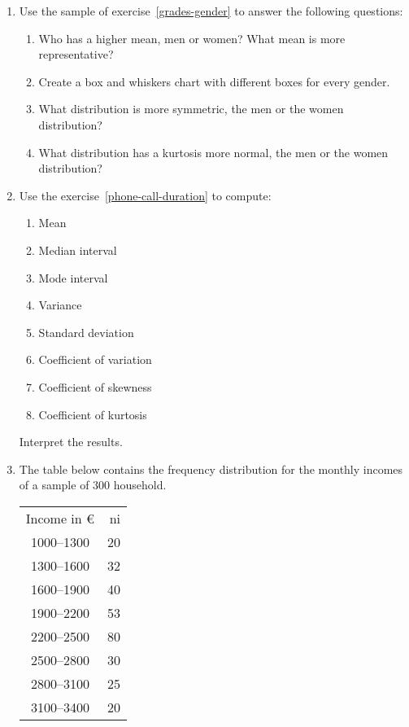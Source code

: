 \begin{enumerate}[leftmargin=*,resume]
\item Use the sample of exercise~\ref{grades-gender} to answer the following questions:
\begin{enumerate}
\item Who has a higher mean, men or women?
What mean is more representative?
\item Create a box and whiskers chart with different boxes for every gender. 
\item What distribution is more symmetric, the men or the women distribution?
\item What distribution has a kurtosis more normal, the men or the women distribution?
\end{enumerate}

\item Use the exercise~\ref{phone-call-duration} to compute:
\begin{enumerate}
\item Mean
\item Median interval
\item Mode interval
\item Variance
\item Standard deviation
\item Coefficient of variation
\item Coefficient of skewness
\item Coefficient of kurtosis
\end{enumerate}
Interpret the results. 

\item The table below contains the frequency distribution for the monthly incomes of a sample of 300 household.
\begin{center}
\begin{tabular}{cr}
\toprule
Income in € & 	ni\\
1000--1300	&	20\\
1300--1600	&	32\\
1600--1900	&	40\\
1900--2200	&	53\\
2200--2500	&	80\\
2500--2800	&	30\\
2800--3100	&	25\\
3100--3400	&	20\\
\bottomrule
\end{tabular}
\end{center}


\end{enumerate}

